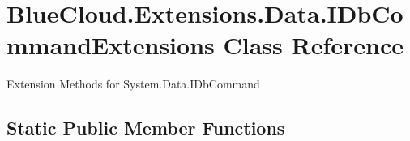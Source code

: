\hypertarget{class_blue_cloud_1_1_extensions_1_1_data_1_1_i_db_command_extensions}{}\section{Blue\+Cloud.\+Extensions.\+Data.\+I\+Db\+Command\+Extensions Class Reference}
\label{class_blue_cloud_1_1_extensions_1_1_data_1_1_i_db_command_extensions}


Extension Methods for System.\+Data.\+I\+Db\+Command  


\subsection*{Static Public Member Functions}
